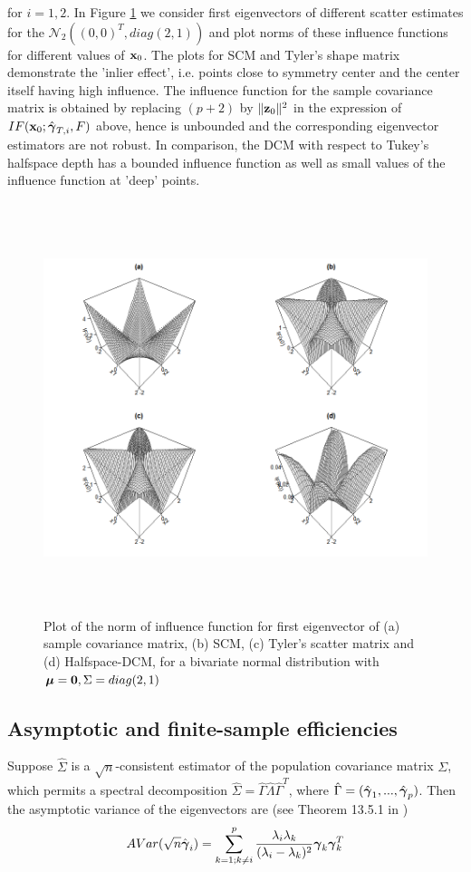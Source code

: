 \documentclass[fleqn,12pt]{article}
\begin{document}
for $i = 1,2$. In Figure \ref{fig:IFnorm} we consider first eigenvectors of different scatter estimates for the $\mathcal{N}_2((0,0)^T, diag(2,1))$ and plot norms of these influence functions for different values of ${\bf{x}}_0$. The plots for SCM and Tyler's shape matrix demonstrate the 'inlier effect', i.e. points close to symmetry center and the center itself having high influence. The influence function for the sample covariance matrix is obtained by replacing $(p+2)$ by $\| {\bf{z}}_0 \|^2$ in the expression of $IF({\bf{x}}_0; \hat {{\boldsymbol{\gamma}}}_{T,i}, F)$ above, hence is unbounded and the corresponding eigenvector estimators are not robust. In comparison, the DCM with respect to Tukey's halfspace depth has a bounded influence function as well as small values of the influence function at 'deep' points.

\begin{figure}[t]
	\centering
		\includegraphics[height=12cm]{../Codes/IFnorm.png}
	\caption{Plot of the norm of influence function for first eigenvector of (a) sample covariance matrix, (b) SCM, (c) Tyler's scatter matrix and (d) Halfspace-DCM, for a bivariate normal distribution with ${\boldsymbol{\mu}} = {\bf 0}, \Sigma = diag(2,1)$}
	\label{fig:IFnorm}
\end{figure}

\subsection{Asymptotic and finite-sample efficiencies}
Suppose $\hat\Sigma$ is a $\sqrt n$-consistent estimator of the population covariance matrix $\Sigma$, which permits a spectral decomposition $ \hat\Sigma = \hat\Gamma \hat\Lambda \hat\Gamma^T $, where $\hat\Gamma = (\hat{{\boldsymbol{\gamma}}}_1,...,\hat{{\boldsymbol{\gamma}}}_p)$. Then the asymptotic variance of the eigenvectors are (see Theorem 13.5.1 in \cite{anderson})
\begin{equation} \label{equation:covevEq}
AVar(\sqrt n\hat {{\boldsymbol{\gamma}}}_i) = \sum_{k=1; k \neq i}^p \frac{\lambda_i \lambda_k}{(\lambda_i - \lambda_k)^2} {\boldsymbol{\gamma}}_k {\boldsymbol{\gamma}}_k^T
\end{equation}
\end{document}
